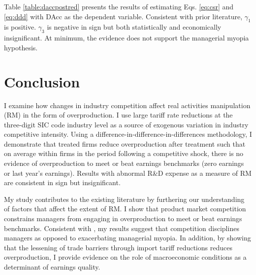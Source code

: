 \documentclass[notitlepage, 12pt]{article}
\begin{document}
\noindent Table \ref{table:daccpostred} presents the results of estimating Eqs. \eqref{eq:csr} and \eqref{eq:ddd} with DAcc as the dependent variable. Consistent with prior literature, $\gamma_{1}$ is positive. $\gamma_{3}$ is negative in sign but both statistically and economically insignificant. At minimum, the evidence does not support the managerial myopia hypothesis.

%
\begin{comment}
\section{TO BE MERGED IN A PREVIOUS SECTION}
``If managers use real activities manipulation and accrual-based earnings management as substitutes for each other \ldots when one activity is relatively more costly, firms engage in more of the other'' \citep{zang:2012}. ``The pre-SOX period was characterized by increasing accrual-based earnings management \ldots but declining real earnings management. Following the passage of SOX, accrual-based earnings management declined significantly, while real earnings management increased significantly'' \citep{cdl:2008}.
\end{comment}
%

\section{Conclusion}\label{conclusion}
I examine how changes in industry competition affect real activities manipulation (RM) in the form of overproduction. I use large tariff rate reductions at the three-digit SIC code industry level as a source of exogenous variation in industry competitive intensity. Using a difference-in-difference-in-differences methodology, I demonstrate that treated firms reduce overproduction after treatment such that on average within firms in the period following a competitive shock, there is no evidence of overproduction to meet or beat earnings benchmarks (zero earnings or last year's earnings). Results with abnormal R\&D expense as a measure of RM are consistent in sign but insignificant.
\newline

\noindent My study contributes to the existing literature by furthering our understanding of factors that affect the extent of RM. I show that product market competition constrains managers from engaging in overproduction to meet or beat earnings benchmarks. Consistent with \citet{bc:2012}, my results suggest that competition disciplines managers as opposed to exacerbating managerial myopia. In addition, by showing that the lessening of trade barriers through import tariff reductions reduces overproduction, I provide evidence on the role of macroeconomic conditions as a determinant of earnings quality.
\newpage
\end{document}
